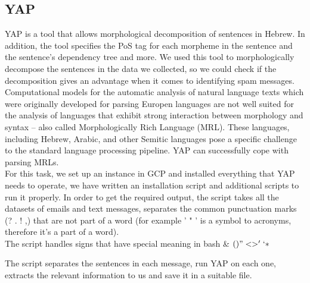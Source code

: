 \documentclass[11pt,a4paper]{article}
\begin{document}
\subsection{YAP}
\label{ssec:YAP}
YAP is a tool that allows morphological decomposition of sentences in Hebrew. In addition, the tool specifies the PoS tag for each morpheme in the sentence and the sentence's dependency tree and more. We used this tool to morphologically decompose the sentences in the data we collected, so we could check if the decomposition gives an advantage when it comes to identifying spam messages.\\
Computational models for the automatic analysis of natural language texts which were originally developed for parsing Europen languages are not well suited for the analysis of languages that exhibit strong interaction between morphology and syntax -- also called Morphologically Rich Language (MRL). These languages, including Hebrew, Arabic, and other Semitic languages pose a specific challenge to the standard language processing pipeline. 
YAP can successfully cope with parsing MRLs.\\
For this task, we set up an instance in GCP and installed everything that YAP needs to operate, we have written an installation script and additional scripts to run it properly. In order to get the required output, the script takes all the datasets of emails and text messages, separates the common punctuation marks (? . ! ,) that are not part of a word (for example ' " ' is a symbol to acronyms, therefore it's a part of a word).\\
The script handles signs that have special meaning in bash \& \mid ${( ) " < > ' ` * }$ 

\noindent The script separates the sentences in each message, run YAP on each one, extracts the relevant information to us and save it in a suitable file.
\end{document}
